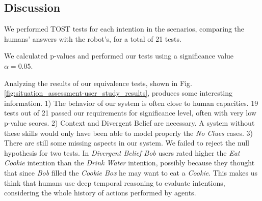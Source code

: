 \subsection{Discussion}
\label{sec:discussion}
We performed TOST tests for each intention in the scenarios, comparing the humans' answers with the robot's, for a total of 21 tests.

We calculated p-values and performed our tests using a significance value $\alpha=0.05$.

Analyzing the results of our equivalence tests, shown in Fig. \ref{fig:situation_assessment-user_study_results}, produces some interesting information. 1) The behavior of our system is often close to human capacities. 19 tests out of 21 passed our requirements for significance level, often with very low p-value scores. 2) Context and Divergent Belief are necessary. A system without these skills would only have been able to model properly the \textit{No Clues} cases. 3) There are still some missing aspects in our system. We failed to reject the null hypothesis for two tests. In \textit{Divergent Belief Bob} users rated higher the \textit{Eat Cookie} intention than the \textit{Drink Water} intention, possibly because they thought that since \textit{Bob} filled the \textit{Cookie Box} he may want to eat a \textit{Cookie}. This makes us think that humans use deep temporal reasoning to evaluate intentions, considering the whole history of actions performed by agents.  

